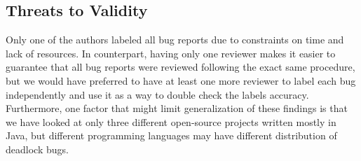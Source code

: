 \subsection{Threats to Validity}

Only one of the authors labeled all bug reports due to constraints on time and lack of resources. In counterpart, having only one reviewer makes it easier to guarantee that all bug reports were reviewed following the exact same procedure, but we would have preferred to have at least one more reviewer to label each bug independently and use it as a way to double check the labels accuracy. Furthermore, one factor that might limit generalization of these findings is that we have looked at only three different open-source projects written mostly in Java, but different programming languages may have different distribution of deadlock bugs.
